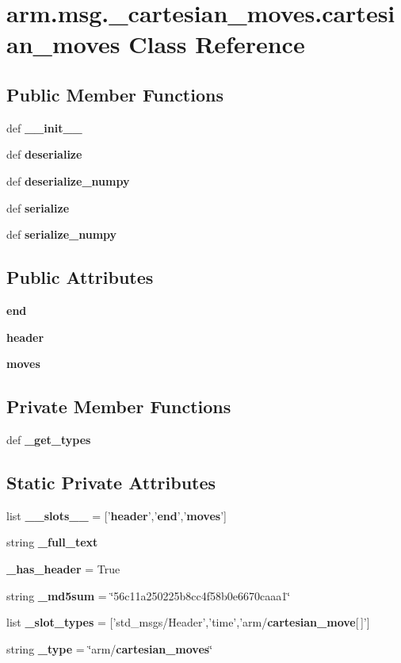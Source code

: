 \section{arm.\-msg.\-\_\-cartesian\-\_\-moves.\-cartesian\-\_\-moves \-Class \-Reference}
\label{classarm_1_1msg_1_1__cartesian__moves_1_1cartesian__moves}
\subsection*{\-Public \-Member \-Functions}
\begin{DoxyCompactItemize}
\item 
def {\bf \-\_\-\-\_\-init\-\_\-\-\_\-}
\item 
def {\bf deserialize}
\item 
def {\bf deserialize\-\_\-numpy}
\item 
def {\bf serialize}
\item 
def {\bf serialize\-\_\-numpy}
\end{DoxyCompactItemize}
\subsection*{\-Public \-Attributes}
\begin{DoxyCompactItemize}
\item 
{\bf end}
\item 
{\bf header}
\item 
{\bf moves}
\end{DoxyCompactItemize}
\subsection*{\-Private \-Member \-Functions}
\begin{DoxyCompactItemize}
\item 
def {\bf \-\_\-get\-\_\-types}
\end{DoxyCompactItemize}
\subsection*{\-Static \-Private \-Attributes}
\begin{DoxyCompactItemize}
\item 
list {\bf \-\_\-\-\_\-slots\-\_\-\-\_\-} = ['{\bf header}','{\bf end}','{\bf moves}']
\item 
string {\bf \-\_\-full\-\_\-text}
\item 
{\bf \-\_\-has\-\_\-header} = \-True
\item 
string {\bf \-\_\-md5sum} = \char`\"{}56c11a250225b8cc4f58b0e6670caaa1\char`\"{}
\item 
list {\bf \-\_\-slot\-\_\-types} = ['std\-\_\-msgs/\-Header','time','arm/{\bf cartesian\-\_\-move}[$\,$]']
\item 
string {\bf \-\_\-type} = \char`\"{}arm/{\bf cartesian\-\_\-moves}\char`\"{}
\end{DoxyCompactItemize}


